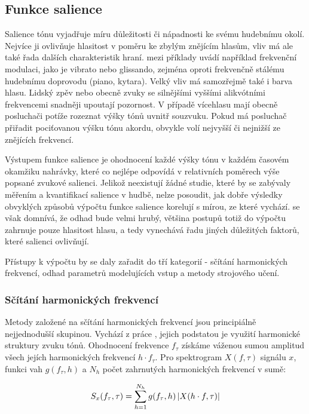 \subsection{Funkce salience}

Salience tónu vyjadřuje míru důležitosti či nápadnosti ke svému hudebnímu okolí. Nejvíce ji ovlivňuje hlasitost v poměru ke zbylým znějícím hlasům, vliv má ale také řada dalších charakteristik hraní. \cite{Dressler2016} mezi příklady uvádí například frekvenční modulaci, jako je vibrato nebo glissando, zejména oproti frekvenčně stálému hudebnímu doprovodu (piano, kytara). Velký vliv má samozřejmě také i barva hlasu. Lidský zpěv nebo obecně zvuky se silnějšími vyššími alikvótními frekvencemi snadněji upoutají pozornost. V případě vícehlasu mají obecně posluchači potíže rozeznat výšky tónů uvnitř souzvuku. Pokud má posluchač přiřadit pociťovanou výšku tónu akordu, obvykle volí nejvyšší či nejnižší ze znějících frekvencí.

Výstupem funkce salience je ohodnocení každé výšky tónu v každém časovém okamžiku nahrávky, které co nejlépe odpovídá v relativních poměrech výše popsané zvukové salienci. Jelikož neexistují žádné studie, které by se zabývaly měřením a kvantifikací salience v hudbě, nelze posoudit, jak dobře výsledky obvyklých způsobů výpočtu funkce salience korelují s mírou, ze které vychází. \cite{Bittner2018a} se však domnívá, že odhad bude velmi hrubý, většina postupů totiž do výpočtu zahrnuje pouze hlasitost hlasu, a tedy vynechává řadu jiných důležitých faktorů, které salienci ovlivňují.

Přístupy k výpočtu by se daly zařadit do tří kategorií - sčítání harmonických frekvencí, odhad parametrů modelujících vstup a metody strojového učení. 

\subsubsection{Sčítání harmonických frekvencí}

Metody založené na sčítání harmonických frekvencí jsou principiálně nejjednodušší skupinou. Vychází z práce \cite{Hermes1988}, jejich podstatou je využití harmonické struktury zvuku tónů. Ohodnocení frekvence $f_\tau$ získáme váženou sumou amplitud všech jejích harmonických frekvencí $h \cdot f_\tau$. Pro spektrogram $X(f, \tau)$ signálu $x$, funkci vah $g(f_\tau, h)$ a $N_h$ počet zahrnutých harmonických frekvencí v sumě:

    $$S_x(f_\tau, \tau) = \sum_{h=1}^{N_h}{g(f_\tau, h)\left|{X(h \cdot f, \tau)}\right|}$$

